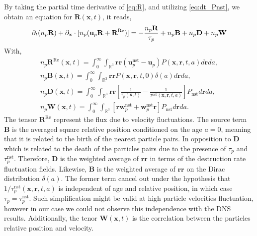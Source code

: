 By taking the partial time derivative of \ref{eq:R}, and utilizing \ref{eq:dt_Pnst}, we obtain an equation for $\textbf{R}(\textbf{x},t)$, it reads,
\begin{equation*}
    \partial_t (n_p\textbf{R})
    + {\partial_\textbf{x}} \cdot [n_p(\textbf{u}_p\textbf{R}
    + \textbf{R}^\text{Re})]
    = 
    - \frac{n_p\textbf{R}}{\tau_p}
    +n_p\textbf{B}
    + n_p\textbf{D}
    + n_p\textbf{W}
    \label{eq:dt_R}
\end{equation*}
With,
\begin{align*}
    n_p \textbf{R}^\text{Re}(\textbf{x},t)
    =
    \int_{0}^\infty
    \int_{\mathbb{R}^3}
    \textbf{rr}(\textbf{u}^\text{nst}_p - \textbf{u}_p)
    P(\textbf{x},\textbf{r},t,a)
    d\textbf{r}da,\\
    n_p \textbf{B}(\textbf{x},t)
    =
    \int_{0}^\infty
    \int_{\mathbb{R}^3}
    \textbf{rr}
    P(\textbf{x},\textbf{r},t,0)\delta(a)
    d\textbf{r}da, \\
    n_p\textbf{D}(\textbf{x},t) = 
    \int_{0}^\infty
    \int_{\mathbb{R}^3} \textbf{rr}
    \left[
        \frac{1}{\tau_p(\textbf{x},t)}
        - \frac{1}{\tau^\text{nst}(\textbf{x},\textbf{r},t,a)}
    \right]
    P_\text{nst}
    d\textbf{r}
    da,\\
    n_p \textbf{W}(\textbf{x},t) = 
    \int_{0}^\infty
    \int_{\mathbb{R}^3} \left[
        \textbf{r} \textbf{w}^\text{nst}_p
        + \textbf{w}^\text{nst}_p\textbf{r}
    \right]P_\text{nst}
    d\textbf{r}
    da.
\end{align*} 
The tensor $\textbf{R}^\text{Re}$ represent the flux due to velocity fluctuations. 
The source term $\textbf{B}$ is the averaged square relative position conditioned on the age $a=0$, meaning that it is related to the birth of the nearest particle pairs. 
In opposition to \textbf{D} which is related to the death of the particles pairs due to the presence of $\tau_p$ and $\tau_p^\text{nst}$.
Therefore, $\textbf{D}$ is the weighted average of $\textbf{rr}$ in terms of the destruction rate fluctuation fields. 
Likewise, $\textbf{B}$ is the weighted average of $\textbf{rr}$ on the Dirac distribution $\delta(a)$. 
The former term cancel out under the hypothesis that $1 / \tau^\text{nst}_p(\textbf{x},\textbf{r},t,a)$ is independent of age and relative position, in which case $\tau_p = \tau^\text{nst}_p$. 
Such simplification might be valid at high particle velocities fluctuation, however in our case we could not observe this independence with the DNS results.  
Additionally, the tenor $\textbf{W}(\textbf{x},t)$ is the correlation between the particles relative position and velocity.
